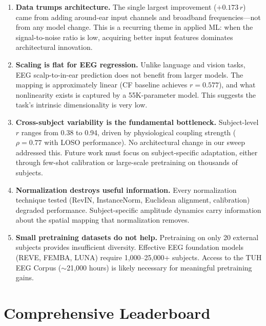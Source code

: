 \documentclass[11pt,a4paper]{article}
\begin{document}
\begin{enumerate}
  \item \textbf{Data trumps architecture.} The single largest
    improvement ($+0.173\,r$) came from adding around-ear input channels
    and broadband frequencies---not from any model change. This is a
    recurring theme in applied ML: when the signal-to-noise ratio is low,
    acquiring better input features dominates architectural innovation.

  \item \textbf{Scaling is flat for EEG regression.} Unlike language and
    vision tasks, EEG scalp-to-in-ear prediction does not benefit from
    larger models. The mapping is approximately linear (CF baseline
    achieves $r=0.577$), and what nonlinearity exists is captured by a
    55K-parameter model. This suggests the task's intrinsic dimensionality
    is very low.

  \item \textbf{Cross-subject variability is the fundamental bottleneck.}
    Subject-level $r$ ranges from 0.38 to 0.94, driven by physiological
    coupling strength ($\rho = 0.77$ with LOSO performance). No
    architectural change in our sweep addressed this. Future work must
    focus on subject-specific adaptation, either through few-shot
    calibration or large-scale pretraining on thousands of subjects.

  \item \textbf{Normalization destroys useful information.} Every
    normalization technique tested (RevIN, InstanceNorm, Euclidean
    alignment, calibration) degraded performance. Subject-specific
    amplitude dynamics carry information about the spatial mapping that
    normalization removes.

  \item \textbf{Small pretraining datasets do not help.} Pretraining on
    only 20 external subjects provides insufficient diversity. Effective
    EEG foundation models (REVE, FEMBA, LUNA) require 1,000--25,000+
    subjects. Access to the TUH EEG Corpus ($\sim$21,000 hours) is
    likely necessary for meaningful pretraining gains.
\end{enumerate}

\section{Comprehensive Leaderboard}
\end{document}
